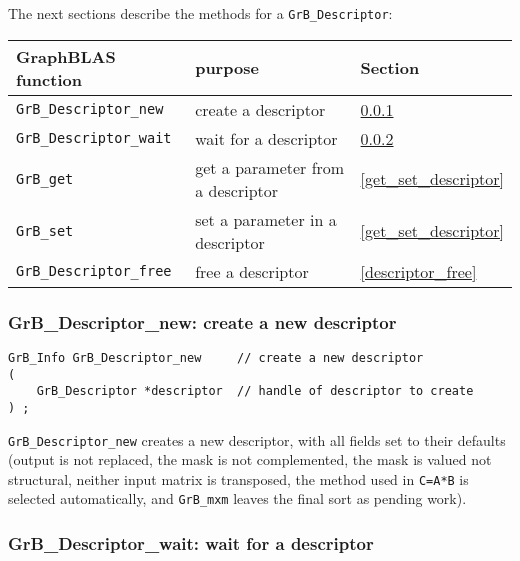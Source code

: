\documentclass[12pt]{article}
\begin{document}
The next sections describe the methods for a \verb'GrB_Descriptor':

\vspace{0.2in}
{\footnotesize
\begin{tabular}{lll}
\hline
GraphBLAS function   & purpose                                      & Section \\
\hline
\verb'GrB_Descriptor_new'        & create a descriptor                  & \ref{descriptor_new} \\
\verb'GrB_Descriptor_wait'       & wait for a descriptor                & \ref{descriptor_wait} \\
\verb'GrB_get'              & get a parameter from a descriptor    & \ref{get_set_descriptor}  \\
\verb'GrB_set'              & set a parameter in a descriptor      & \ref{get_set_descriptor}  \\
\verb'GrB_Descriptor_free'       & free a descriptor                    & \ref{descriptor_free} \\
\hline
\end{tabular}
}

\newpage
\subsubsection{{\sf GrB\_Descriptor\_new:}  create a new descriptor}
\label{descriptor_new}

\begin{mdframed}[userdefinedwidth=6in]
{\footnotesize
\begin{verbatim}
GrB_Info GrB_Descriptor_new     // create a new descriptor
(
    GrB_Descriptor *descriptor  // handle of descriptor to create
) ;
\end{verbatim} } \end{mdframed}

\verb'GrB_Descriptor_new' creates a new descriptor, with all fields set to
their defaults (output is not replaced, the mask is not complemented, the mask
is valued not structural, neither input matrix is transposed, the method
used in \verb'C=A*B' is selected automatically, and \verb'GrB_mxm' leaves
the final sort as pending work).

\subsubsection{{\sf GrB\_Descriptor\_wait:} wait for a descriptor}
\label{descriptor_wait}
\end{document}
